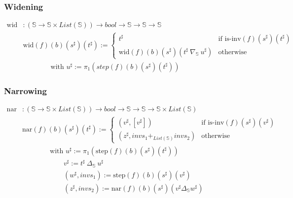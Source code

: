 \documentclass[aspectratio=169]{beamer}
\begin{document}
        \begin{frame}
            \frametitle{Widening}
            \begin{align*}
                \text{wid} &: (\mathbb{S} \to \mathbb{S} \times List(\mathbb{S})) \to bool \to \mathbb{S} \to \mathbb{S} \to \mathbb{S} \\
                &\text{wid} (f) (b) (s^{\sharp}) (t^{\sharp}) := \begin{cases}
                                                                t^{\sharp} & \text{if } \text{is-inv} (f) (s^{\sharp}) (t^{\sharp}) \\
                                                                \text{wid} (f) (b) (s^{\sharp}) (t^{\sharp}\ \nabla_\mathbb{S}\ u^{\sharp}) & \text{otherwise}
                                                            \end{cases} \\
                & \qquad \qquad \text{with } u^{\sharp} := \pi_1 (step (f) (b) (s^{\sharp}) (t^{\sharp}))
            \end{align*}
            
        \end{frame}

        \begin{frame}
            \frametitle{Narrowing}
            \begin{align*}
                \text{nar} &: (\mathbb{S} \to \mathbb{S} \times List(\mathbb{S})) \to bool \to \mathbb{S} \to \mathbb{S} \to \mathbb{S} \times List(\mathbb{S}) \\
                &\text{nar} (f) (b) (s^{\sharp}) (t^{\sharp}) := \begin{cases}
                                                                (v^{\sharp}, [v^{\sharp}]) & \text{if } \text{is-inv} (f) (s^{\sharp}) (v^{\sharp}) \\
                                                                (z^{\sharp}, invs_1 +_{List(\mathbb{S})} invs_2) & \text{otherwise}
                                                                \end{cases} \\
                & \qquad \qquad \text{with } u^{\sharp} := \pi_1 (\text{step} (f) (b) (s^{\sharp}) (t^{\sharp})) \\ 
                & \qquad \qquad \qquad v^{\sharp} := t^{\sharp}\ \Delta_\mathbb{S}\ u^{\sharp} \\
                & \qquad \qquad \qquad (w^{\sharp}, invs_1) := \text{step} (f) (b) (s^{\sharp}) (v^{\sharp}) \\
                & \qquad \qquad \qquad (z^{\sharp}, invs_2) := \text{nar} (f) (b) (s^{\sharp}) (v^{\sharp} \Delta_\mathbb{S} w^{\sharp})
            \end{align*}
        
        \end{frame}
\end{document}

